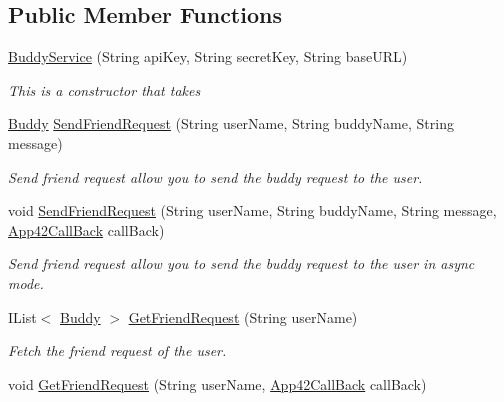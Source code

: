 \subsection*{Public Member Functions}
\begin{DoxyCompactItemize}
\item 
\hyperlink{classcom_1_1shephertz_1_1app42_1_1paas_1_1sdk_1_1csharp_1_1buddy_1_1_buddy_service_acac1e494e5ad9908a06b71390df7d606}{Buddy\+Service} (String api\+Key, String secret\+Key, String base\+U\+R\+L)
\begin{DoxyCompactList}\small\item\em This is a constructor that takes \end{DoxyCompactList}\item 
\hyperlink{classcom_1_1shephertz_1_1app42_1_1paas_1_1sdk_1_1csharp_1_1buddy_1_1_buddy}{Buddy} \hyperlink{classcom_1_1shephertz_1_1app42_1_1paas_1_1sdk_1_1csharp_1_1buddy_1_1_buddy_service_a6e664761a1e75091be06d82e32973071}{Send\+Friend\+Request} (String user\+Name, String buddy\+Name, String message)
\begin{DoxyCompactList}\small\item\em Send friend request allow you to send the buddy request to the user. \end{DoxyCompactList}\item 
void \hyperlink{classcom_1_1shephertz_1_1app42_1_1paas_1_1sdk_1_1csharp_1_1buddy_1_1_buddy_service_a8a4602596db2801529205ba19751b062}{Send\+Friend\+Request} (String user\+Name, String buddy\+Name, String message, \hyperlink{interfacecom_1_1shephertz_1_1app42_1_1paas_1_1sdk_1_1csharp_1_1_app42_call_back}{App42\+Call\+Back} call\+Back)
\begin{DoxyCompactList}\small\item\em Send friend request allow you to send the buddy request to the user in async mode. \end{DoxyCompactList}\item 
I\+List$<$ \hyperlink{classcom_1_1shephertz_1_1app42_1_1paas_1_1sdk_1_1csharp_1_1buddy_1_1_buddy}{Buddy} $>$ \hyperlink{classcom_1_1shephertz_1_1app42_1_1paas_1_1sdk_1_1csharp_1_1buddy_1_1_buddy_service_a01b63bc32b9ddb188b17bae4ecba36e5}{Get\+Friend\+Request} (String user\+Name)
\begin{DoxyCompactList}\small\item\em Fetch the friend request of the user. \end{DoxyCompactList}\item 
void \hyperlink{classcom_1_1shephertz_1_1app42_1_1paas_1_1sdk_1_1csharp_1_1buddy_1_1_buddy_service_aef6f7e3f557ed27ca720ed6a9ec1fb51}{Get\+Friend\+Request} (String user\+Name, \hyperlink{interfacecom_1_1shephertz_1_1app42_1_1paas_1_1sdk_1_1csharp_1_1_app42_call_back}{App42\+Call\+Back} call\+Back)

\end{DoxyCompactItemize}
